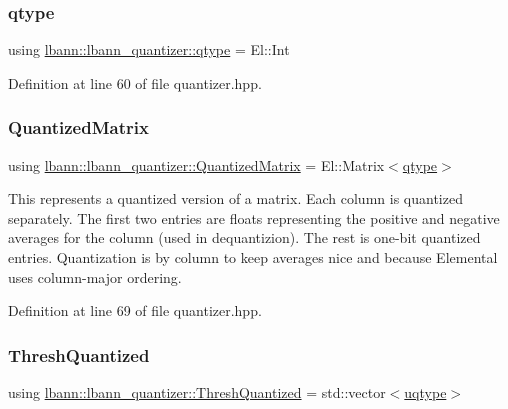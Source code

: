 \subsubsection{\texorpdfstring{qtype}{qtype}}
{\footnotesize\ttfamily using \hyperlink{classlbann_1_1lbann__quantizer_afcda642ff1b44d31eec910909c3d013e}{lbann\+::lbann\+\_\+quantizer\+::qtype} =  El\+::\+Int}



Definition at line 60 of file quantizer.\+hpp.

\mbox{\label{classlbann_1_1lbann__quantizer_a399f3f8c393b6021b43e95d1ce6ea28c}} 
\subsubsection{\texorpdfstring{Quantized\+Matrix}{QuantizedMatrix}}
{\footnotesize\ttfamily using \hyperlink{classlbann_1_1lbann__quantizer_a399f3f8c393b6021b43e95d1ce6ea28c}{lbann\+::lbann\+\_\+quantizer\+::\+Quantized\+Matrix} =  El\+::\+Matrix$<$\hyperlink{classlbann_1_1lbann__quantizer_afcda642ff1b44d31eec910909c3d013e}{qtype}$>$}

This represents a quantized version of a matrix. Each column is quantized separately. The first two entries are floats representing the positive and negative averages for the column (used in dequantizion). The rest is one-\/bit quantized entries. Quantization is by column to keep averages nice and because Elemental uses column-\/major ordering. 

Definition at line 69 of file quantizer.\+hpp.

\mbox{\label{classlbann_1_1lbann__quantizer_a85ea8e298c2975b4f802855278406aa7}} 
\subsubsection{\texorpdfstring{Thresh\+Quantized}{ThreshQuantized}}
{\footnotesize\ttfamily using \hyperlink{classlbann_1_1lbann__quantizer_a85ea8e298c2975b4f802855278406aa7}{lbann\+::lbann\+\_\+quantizer\+::\+Thresh\+Quantized} =  std\+::vector$<$\hyperlink{classlbann_1_1lbann__quantizer_ac8b63c86fc871e248ce20c7af19a7fad}{uqtype}$>$}



